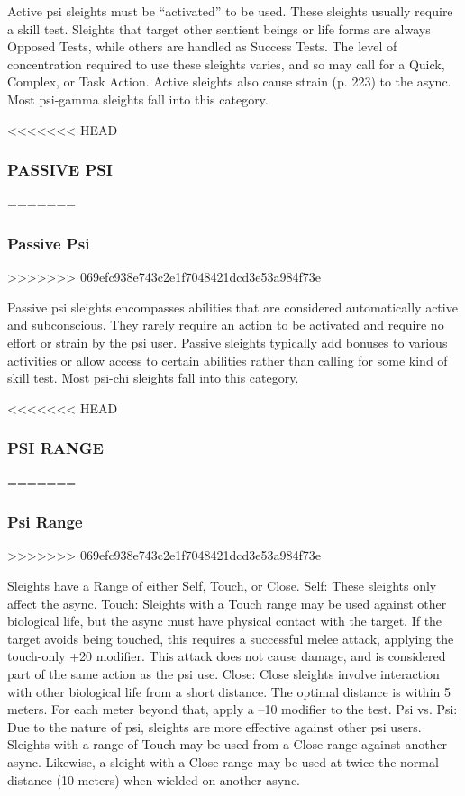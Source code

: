 Active psi sleights must be “activated” to be used.
These sleights usually require a skill test. Sleights that
target other sentient beings or life forms are always
Opposed Tests, while others are handled as Success
Tests. The level of concentration required to use these
sleights varies, and so may call for a Quick, Complex,
or Task Action. Active sleights also cause strain (p.
223) to the async. Most psi-gamma sleights fall into
this category.

<<<<<<< HEAD
\subsubsection{PASSIVE PSI}
=======
\subsubsection{Passive Psi}
>>>>>>> 069efc938e743c2e1f7048421dcd3e53a984f73e

Passive psi sleights encompasses abilities that are considered
automatically active and subconscious. They
rarely require an action to be activated and require
no effort or strain by the psi user. Passive sleights typically
add bonuses to various activities or allow access
to certain abilities rather than calling for some kind of
skill test. Most psi-chi sleights fall into this category.

<<<<<<< HEAD
\subsubsection{PSI RANGE}
=======
\subsubsection{Psi Range}
>>>>>>> 069efc938e743c2e1f7048421dcd3e53a984f73e

Sleights have a Range of either Self, Touch, or Close.
Self: These sleights only affect the async.
Touch: Sleights with a Touch range may be used
against other biological life, but the async must have
physical contact with the target. If the target avoids
being touched, this requires a successful melee attack,
applying the touch-only +20 modifier. This attack
does not cause damage, and is considered part of the
same action as the psi use.
Close: Close sleights involve interaction with other
biological life from a short distance. The optimal distance
is within 5 meters. For each meter beyond that,
apply a –10 modifier to the test.
Psi vs. Psi: Due to the nature of psi, sleights are
more effective against other psi users. Sleights with
a range of Touch may be used from a Close range
against another async. Likewise, a sleight with a Close
range may be used at twice the normal distance (10
meters) when wielded on another async.

